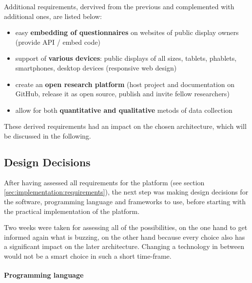 	Additional requirements, dervived from the previous and complemented with additional ones, are listed below:

	\begin{itemize}[itemsep=0pt] 
	\item easy \textbf{embedding of questionnaires} on websites of public display owners (provide API / embed code)
	\item support of \textbf{various devices}: public displays of all sizes, tablets, phablets, smartphones, desktop devices (responsive web design)
	\item create an \textbf{open research platform} (host project and documentation on GitHub, release it as open source, publish and invite fellow researchers)
	\item allow for both \textbf{quantitative and qualitative} metods of data collection
	\end{itemize}


	These derived requirements had an impact on the chosen architecture, which will be discussed in the following.



\subsection{Design Decisions}
\label{sec:implementation:design-decisions}

	After having assessed all requirements for the platform (see section \ref{sec:implementation:requirements}), the next step was making design decisions for the software, programming language and frameworks to use, before starting with the practical implementation of the platform. 

	Two weeks were taken for assessing all of the possibilities, on the one hand to get informed again what is buzzing, on the other hand because every choice also has a significant impact on the later architecture. Changing a technology in between would not be a smart choice in such a short time-frame. 



	\paragraph{Programming language}

